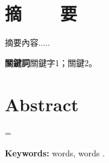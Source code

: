 \documentclass[14pt, a4paper,openany]{ctexbook} %
\newcommand{\sihao}{\fontsize{14pt}{\baselineskip}\selectfont}%
\renewcommand\thechapter{第\chinese{chapter}章}  %
\renewcommand{\chaptername}{{\thechapter}}
\numberwithin{figure}{chapter}
\numberwithin{table}{chapter}
\begin{document}
\begin{titlepage}
\begin{center}
{\begin{center}
\begin{table}[htbp]
\end{table}%
\end{center}



}
\end{center}

\end{titlepage}
\sihao\linespread{1.3} \parskip=0pt
\pagestyle{fancy}                    %
\rhead{\leftmark}
\pagestyle{fancy} %

\chapter*{摘~~~~要}
摘要內容.....









\vspace{1.6cm}
 \bigskip
\noindent \textbf{關鍵詞}關鍵字1；關鍵2。




\newpage


\thispagestyle{plain} %
\sihao
\chapter*{Abstract}

\begin{spacing}{1.3}{\sihao
{}
\emergencystretch=\maxdimen
{}



\vspace{1.5cm}
\noindent \textbf{Keywords:} words, words .
 }
\end{spacing}
\newpage
\end{document}
